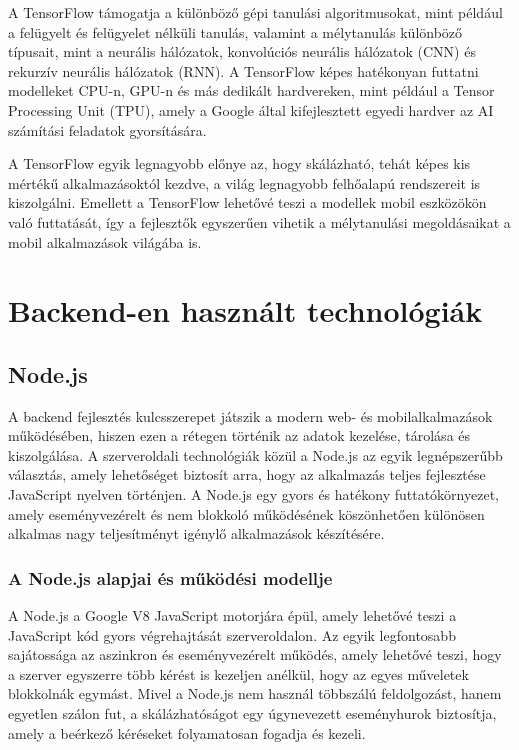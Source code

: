 \documentclass[
]{thesis-ekf}
\theoremstyle{definition}
\theoremstyle{remark}
\begin{document}
	A TensorFlow támogatja a különböző gépi tanulási algoritmusokat, mint például a felügyelt és felügyelet nélküli tanulás, valamint a mélytanulás különböző típusait, mint a neurális hálózatok, konvolúciós neurális hálózatok (CNN) és rekurzív neurális hálózatok (RNN). A TensorFlow képes hatékonyan futtatni modelleket CPU-n, GPU-n és más dedikált hardvereken, mint például a Tensor Processing Unit (TPU), amely a Google által kifejlesztett egyedi hardver az AI számítási feladatok gyorsítására.
	
	A TensorFlow egyik legnagyobb előnye az, hogy skálázható, tehát képes kis mértékű alkalmazásoktól kezdve, a világ legnagyobb felhőalapú rendszereit is kiszolgálni. Emellett a TensorFlow lehetővé teszi a modellek mobil eszközökön való futtatását, így a fejlesztők egyszerűen vihetik a mélytanulási megoldásaikat a mobil alkalmazások világába is.
	
	
\chapter{Backend-en használt technológiák}

\section{Node.js}	
A backend fejlesztés kulcsszerepet játszik a modern web- és mobilalkalmazások működésében, hiszen ezen a rétegen történik az adatok kezelése, tárolása és kiszolgálása. A szerveroldali technológiák közül a Node.js az egyik legnépszerűbb választás, amely lehetőséget biztosít arra, hogy az alkalmazás teljes fejlesztése JavaScript nyelven történjen. A Node.js egy gyors és hatékony futtatókörnyezet, amely eseményvezérelt és nem blokkoló működésének köszönhetően különösen alkalmas nagy teljesítményt igénylő alkalmazások készítésére.

\subsection{A Node.js alapjai és működési modellje}

A Node.js a Google V8 JavaScript motorjára épül, amely lehetővé teszi a JavaScript kód gyors végrehajtását szerveroldalon. Az egyik legfontosabb sajátossága az aszinkron és eseményvezérelt működés, amely lehetővé teszi, hogy a szerver egyszerre több kérést is kezeljen anélkül, hogy az egyes műveletek blokkolnák egymást. Mivel a Node.js nem használ többszálú feldolgozást, hanem egyetlen szálon fut, a skálázhatóságot egy úgynevezett eseményhurok biztosítja, amely a beérkező kéréseket folyamatosan fogadja és kezeli.
\end{document}
